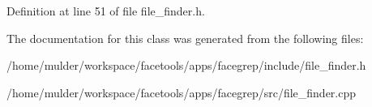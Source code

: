 Definition at line 51 of file file\+\_\+finder.\+h.



The documentation for this class was generated from the following files\+:\begin{DoxyCompactItemize}
\item 
/home/mulder/workspace/facetools/apps/facegrep/include/file\+\_\+finder.\+h\item 
/home/mulder/workspace/facetools/apps/facegrep/src/file\+\_\+finder.\+cpp\end{DoxyCompactItemize}
